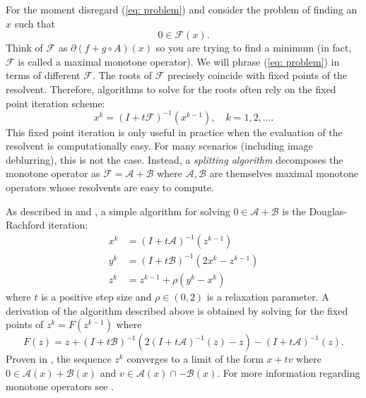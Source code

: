 \documentclass[12pt]{article}
\begin{document}
For the moment disregard (\ref{eq: problem}) and consider the problem
of finding an $x$ such that 
\begin{equation}
0 \in \mathcal{F}(x). \label{eq: monotone}
\end{equation}
Think of $\mathcal{F}$ as $\partial (f + g \circ A)(x)$ so you are trying to find a minimum (in fact, $\mathcal{F}$ is called a maximal
monotone operator). We will phrase (\ref{eq: problem}) in terms of different $\mathcal{F}$. The roots of $\mathcal{F}$
precisely coincide with fixed points of the resolvent. Therefore,
algorithms to solve for the roots often rely on the fixed point iteration scheme:
\[ x^k = (I + t\mathcal{F})^{-1}(x^{k-1}), \quad k = 1, 2, \hdots.\] 
This fixed point iteration is only useful in practice when the evaluation of the
resolvent is computationally easy. For many scenarios (including image
deblurring), this is not the case. Instead, a \textit{splitting
  algorithm} decomposes the monotone operator as $\mathcal{F} =
\mathcal{A} + \mathcal{B}$ where $\mathcal{A}, \mathcal{B}$ are
themselves maximal monotone operators whose resolvents are easy to
compute. 

As described in \cite{Eckstein92} and \cite{Vandenberghe14}, a simple
algorithm for solving $0 \in \mathcal{A} + \mathcal{B}$ is the
Douglas-Rachford iteration:
\begin{align}
x^k &= (I+t\mathcal{A})^{-1}(z^{k-1}) \label{eq: scheme1} \\
y^k &=(I + t \mathcal{B})^{-1}(2x^k - z^{k-1})\\
z^k &= z^{k-1} + \rho(y^k - x^k) \label{eq: scheme3}
\end{align}
where $t$ is a positive step size and $\rho \in (0, 2)$ is a
relaxation parameter. A derivation of the algorithm
described above is obtained by solving for the fixed points of $z^k = F(z^{k-1})$ where 
\[F(z) = z + (I + t\mathcal{B})^{-1} ( 2 (I+t \mathcal{A})^{-1}(z) -z)
- (I + t \mathcal{A})^{-1}(z).\]
Proven in \cite{Eckstein92}, the sequence $z^k$ converges to a limit of the
form $x + tv$ where $0 \in \mathcal{A}(x) + \mathcal{B}(x)$ and $v \in
\mathcal{A}(x) \cap \mathcal{-B}(x)$. For more information regarding
monotone operators see \cite{Rockafellar98}. 
\end{document}
